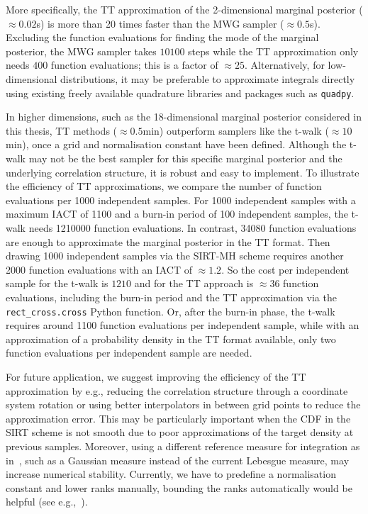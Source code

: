 More specifically, the TT approximation of the 2-dimensional marginal posterior ($\approx0.02$s) is more than 20 times faster than the MWG sampler ($\approx0.5$s).
Excluding the function evaluations for finding the mode of the marginal posterior, the MWG sampler takes $10100$ steps while the TT approximation only needs $400$ function evaluations; this is a factor of $\approx25$.
Alternatively, for low-dimensional distributions, it may be preferable to approximate integrals directly using existing freely available quadrature libraries and packages such as \texttt{quadpy}.

In higher dimensions, such as the 18-dimensional marginal posterior considered in this thesis, TT methods ($\approx0.5$min) outperform samplers like the t-walk ($\approx 10$min), once a grid and normalisation constant have been defined.
Although the t-walk may not be the best sampler for this specific marginal posterior and the underlying correlation structure, it is robust and easy to implement.
To illustrate the efficiency of TT approximations, we compare the number of function evaluations per 1000 independent samples.
For 1000 independent samples with a maximum IACT of 1100 and a burn-in period of 100 independent samples, the t-walk needs 1210000 function evaluations. 
In contrast, 34080 function evaluations are enough to approximate the marginal posterior in the TT format.
Then drawing 1000 independent samples via the SIRT-MH scheme requires another 2000 function evaluations with an IACT of $\approx 1.2$.
So the cost per independent sample for the t-walk is $1210$ and for the TT approach is $\approx 36$ function evaluations, including the burn-in period and the TT approximation via the \texttt{rect\_cross.cross} Python function.
Or, after the burn-in phase, the t-walk requires around 1100 function evaluations per independent sample, while with an approximation of a probability density in the TT format available, only two function evaluations per independent sample are needed.

For future application, we suggest improving the efficiency of the TT approximation by e.g., reducing the correlation structure through a coordinate system rotation or using better interpolators in between grid points to reduce the approximation error.
This may be particularly important when the CDF in the SIRT scheme is not smooth due to poor approximations of the target density at previous samples.  
Moreover, using a different reference measure for integration as in~\cite{cui2022deep}, such as a Gaussian measure instead of the current Lebesgue measure, may increase numerical stability.
Currently, we have to predefine a normalisation constant and lower ranks manually, bounding the ranks automatically would be helpful (see e.g.,~\cite{Rohrbach2022tterror}).



